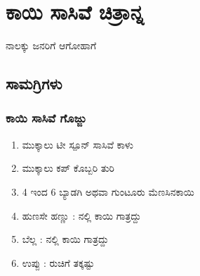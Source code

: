 \documentclass[recipes.tex]{subfiles}
\begin{document}
\section{ಕಾಯಿ ಸಾಸಿವೆ ಚಿತ್ರಾನ್ನ}
ನಾಲಕ್ಕು ಜನರಿಗೆ ಆಗೋಹಾಗೆ
\subsection{ಸಾಮಗ್ರಿಗಳು}
\subsubsection{ಕಾಯಿ ಸಾಸಿವೆ ಗೊಜ್ಜು}
\begin{enumerate}
    \item ಮುಕ್ಕಾಲು ಟೀ ಸ್ಪೂನ್ ಸಾಸಿವೆ ಕಾಳು 
    \item ಮುಕ್ಕಾಲು ಕಪ್ ಕೊಬ್ಬರಿ ತುರಿ 
    \item 4 ಇಂದ 6 ಬ್ಯಾಡಗಿ ಅಥವಾ ಗುಂಟೂರು ಮೆಣಸಿನಕಾಯಿ  
    \item ಹುಣಸೇ ಹಣ್ಣು : ನಲ್ಲಿ ಕಾಯಿ ಗಾತ್ರದ್ದು  
    \item ಬೆಲ್ಲ : ನಲ್ಲಿ ಕಾಯಿ ಗಾತ್ರದ್ದು  
    \item ಉಪ್ಪು : ರುಚಿಗೆ ತಕ್ಕಷ್ಟು
\end{enumerate}
\end{document}
